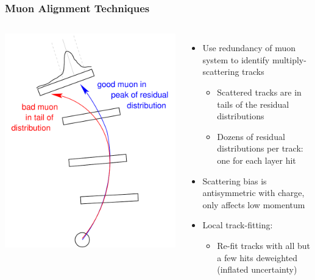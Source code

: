 \documentclass[compress]{beamer}
\begin{document}
\begin{frame}
\frametitle{Muon Alignment Techniques}

\begin{columns}
\includegraphics[width=1.285\linewidth]{trackcut.pdf}

\begin{itemize}
\item Use redundancy of muon system to identify multiply-scattering
tracks
\begin{itemize}
\item Scattered tracks are in tails of the residual distributions
\item Dozens of residual distributions per track: one for each layer hit
\end{itemize}

\item Scattering bias is antisymmetric with charge, only affects low momentum

\item<2-3> Local track-fitting:
\begin{itemize}
\item Re-fit tracks with all but a few hits deweighted (inflated uncertainty)


\end{itemize}
\end{itemize}
\end{columns}
\end{frame}
\end{document}
